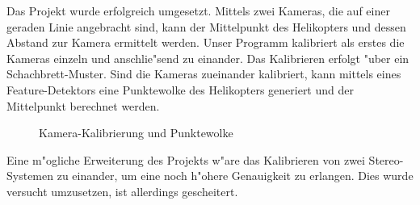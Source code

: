 \noindent Das Projekt wurde erfolgreich umgesetzt.
Mittels zwei Kameras, die auf einer geraden Linie angebracht sind, kann der Mittelpunkt des Helikopters und dessen Abstand zur Kamera ermittelt werden.\newline
Unser Programm kalibriert als erstes die Kameras einzeln und anschlie"send zu einander. Das Kalibrieren erfolgt "uber ein Schachbrett-Muster. Sind die Kameras zueinander kalibriert, kann mittels eines Feature-Detektors eine Punktewolke des Helikopters generiert und der Mittelpunkt berechnet werden.

\begin{figure}%
	\centering
	\qquad
	\caption{Kamera-Kalibrierung und Punktewolke}%
	\label{fig:extendetabstract}%
\end{figure}
\noindent Eine m"ogliche Erweiterung des Projekts w"are das Kalibrieren von zwei Stereo-Systemen zu einander, um eine noch h"ohere Genauigkeit zu erlangen. Dies wurde versucht umzusetzen, ist allerdings gescheitert.

